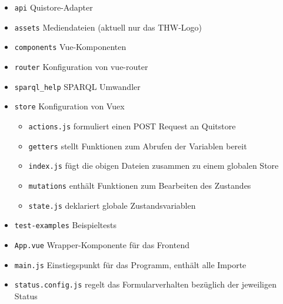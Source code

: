 \documentclass[a4paper,11pt,oneside, titlepage]{article}
\begin{document}
  \newpage


    \begin{itemize}
      \item \verb+api+ Quistore-Adapter
      \item \verb+assets+ Mediendateien (aktuell nur das THW-Logo)
      \item \verb+components+ Vue-Komponenten
      \item \verb+router+ Konfiguration von vue-router
      \item \verb+sparql_help+ SPARQL Umwandler
      \item \verb+store+ Konfiguration von Vuex
        \begin{itemize}
          \item \verb+actions.js+ formuliert einen POST Request an Quitstore
          \item \verb+getters+ stellt Funktionen zum Abrufen der Variablen bereit
          \item \verb+index.js+ fügt die obigen Dateien zusammen zu einem globalen Store
          \item \verb+mutations+ enthält Funktionen zum Bearbeiten des Zustandes
          \item \verb+state.js+ deklariert globale Zustandsvariablen
        \end{itemize}
      \item \verb+test-examples+ Beispieltests
      \item \verb+App.vue+ Wrapper-Komponente für das Frontend
      \item \verb+main.js+ Einstiegspunkt für das Programm, enthält alle Importe
      \item \verb+status.config.js+ regelt das Formularverhalten bezüglich der jeweiligen Status
    \end{itemize}

\begin{minipage}{16cm}
\end{minipage}
\end{document}
